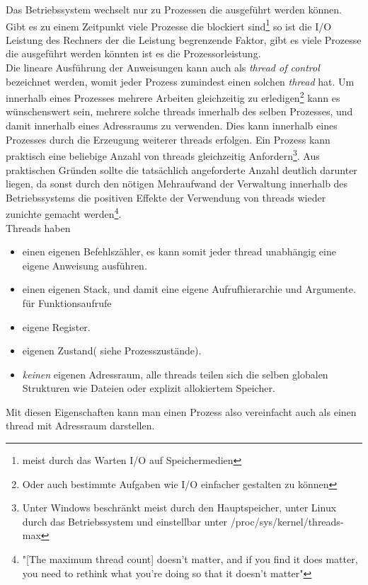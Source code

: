 Das Betriebssystem wechselt nur zu Prozessen die ausgeführt werden können. Gibt es zu einem Zeitpunkt viele Prozesse die blockiert sind\footnote{meist durch das Warten I/O auf Speichermedien} so ist die I/O Leistung des Rechners der die Leistung begrenzende Faktor, gibt es viele Prozesse die ausgeführt werden könnten ist es die Prozessorleistung.
\\Die lineare Ausführung der Anweisungen kann auch als \emph{thread of control} bezeichnet werden, womit jeder Prozess zumindest einen solchen \emph{thread} hat. Um innerhalb eines Prozesses mehrere Arbeiten gleichzeitig zu erledigen\footnote{Oder auch bestimmte Aufgaben wie I/O einfacher gestalten zu können} kann es wünschenswert sein, mehrere solche threads innerhalb des selben Prozesses, und damit innerhalb eines Adressraums zu verwenden. Dies kann innerhalb eines Prozesses durch die Erzeugung weiterer threads erfolgen. Ein Prozess kann praktisch eine beliebige Anzahl von threads gleichzeitig Anfordern\footnote{Unter Windows beschränkt meist durch den Hauptspeicher, unter Linux durch das Betriebssystem und einstellbar unter /proc/sys/kernel/threads-max}. Aus praktischen Gründen sollte die tatsächlich angeforderte Anzahl deutlich darunter liegen, da sonst durch den nötigen Mehraufwand der Verwaltung innerhalb des Betriebssystems die positiven Effekte der Verwendung von threads wieder zunichte gemacht werden\footnote{"[The maximum thread count] doesn't matter, and if you find it does matter, you need to rethink what you're doing so that it doesn't matter"\cite{stacko_threadcount}}.
\\Threads haben \cite[S. 148]{tanenbaum2016}
\begin{itemize}
	\item einen eigenen Befehlszähler, es kann somit jeder thread unabhängig eine eigene Anweisung ausführen.
	\item einen eigenen Stack, und damit eine eigene Aufrufhierarchie und Argumente. für Funktionsaufrufe
	\item eigene Register.
	\item eigenen Zustand( siehe Prozesszustände).
	\item \emph{keinen} eigenen Adressraum, alle threads teilen sich die selben globalen Strukturen wie Dateien oder explizit allokiertem Speicher.
\end{itemize}	
Mit diesen Eigenschaften kann man einen Prozess also vereinfacht auch als einen thread mit Adressraum darstellen.\cite[S. 1]{butenhof1997}
